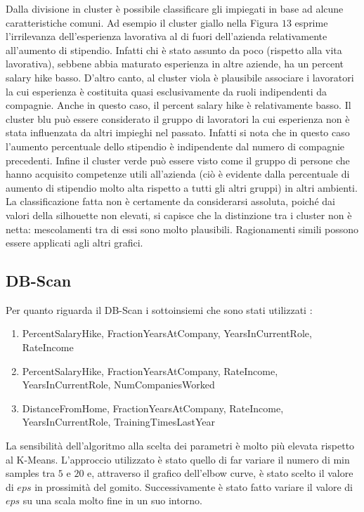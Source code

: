 \documentclass[a4paper,9pt]{article}
\begin{document}
Dalla divisione in cluster è possibile classificare gli impiegati in base ad alcune caratteristiche comuni.
Ad esempio il cluster giallo nella Figura $13$  esprime l'irrilevanza dell'esperienza lavorativa al di fuori dell'azienda relativamente all'aumento di stipendio. Infatti chi è stato assunto da poco (rispetto alla vita lavorativa), sebbene abbia maturato esperienza in altre aziende, ha un percent salary hike basso.
D'altro canto, al cluster viola è plausibile associare i lavoratori la cui esperienza è costituita quasi esclusivamente da ruoli indipendenti da compagnie. Anche in questo caso, il percent salary hike è relativamente basso.
Il cluster blu può essere considerato il gruppo di lavoratori la cui esperienza non è stata influenzata da altri impieghi nel passato. Infatti si nota che in questo caso l'aumento percentuale dello stipendio è indipendente dal numero di compagnie precedenti.
Infine il cluster verde può essere visto come il gruppo di persone che hanno acquisito competenze utili all'azienda (ciò è evidente dalla percentuale di aumento di stipendio molto alta rispetto a tutti gli altri gruppi) in altri ambienti.\\
La classificazione fatta non è certamente da considerarsi assoluta, poiché dai valori della silhouette non elevati, si capisce che la distinzione tra i cluster non è netta: mescolamenti tra di essi sono molto plausibili.
Ragionamenti simili possono essere applicati agli altri grafici.


\subsection{DB-Scan}
Per quanto riguarda il DB-Scan i sottoinsiemi che sono stati utilizzati :\\
\begin{enumerate}
\item PercentSalaryHike, FractionYearsAtCompany, YearsInCurrentRole, RateIncome
\item PercentSalaryHike, FractionYearsAtCompany, RateIncome, YearsInCurrentRole, NumCompaniesWorked
\item DistanceFromHome, FractionYearsAtCompany, RateIncome, YearsInCurrentRole, TrainingTimesLastYear
\end{enumerate}

La sensibilità dell'algoritmo alla scelta dei parametri è molto più elevata rispetto al K-Means. L'approccio utilizzato è stato quello di far variare il numero di min samples tra $5$ e $20$ e, attraverso il grafico dell'elbow curve, è stato scelto il valore di $eps$ in prossimità del gomito. Successivamente è stato fatto variare il valore di $eps$ su una scala molto fine in un suo intorno.
\end{document}

